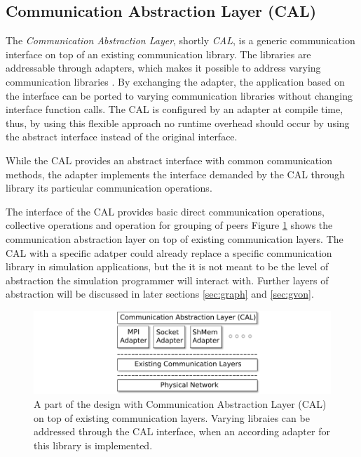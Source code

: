 \subsection{Communication Abstraction Layer (CAL)}
\label{sec:cal}


The \textit{Communication Abstraction Layer}, shortly \textit{CAL}, is
a generic communication interface on top of an existing communication
library. The libraries are addressable through adapters, which makes it
possible to address varying communication libraries . By exchanging
the adapter, the application based on the interface can be ported to
varying communication libraries without changing interface function
calls. The CAL is configured by an adapter at compile time, thus, by
using this flexible approach no runtime overhead should occur by using
the abstract interface instead of the original interface.

While the CAL provides an abstract interface with common communication
methods,  the adapter  implements the  interface demanded  by the  CAL
through library  its particular communication  operations. 

The  interface of
the  CAL provides  basic direct  communication operations,  collective
operations and  operation for  grouping of peers  Figure \ref{fig:cal}
shows  the   communication  abstraction  layer  on   top  of  existing
communication layers.  The CAL with  a specific adatper  could already
replace a  specific communication library in  simulation applications,
but the it is not meant to be the level of abstraction the simulation
programmer will interact  with. Further layers of  abstraction will be
discussed in later sections \ref{sec:graph} and \ref{sec:gvon}.

\begin{figure}[H]
  \centering \includegraphics[width=\textwidth]{graphics/30_cal}
  \caption{A part of the design with Communication Abstraction Layer
    (CAL) on top of existing communication layers. Varying libraies
    can be addressed through the CAL interface, when an according
    adapter for this library is implemented.}
  \label{fig:cal}
\end{figure}

